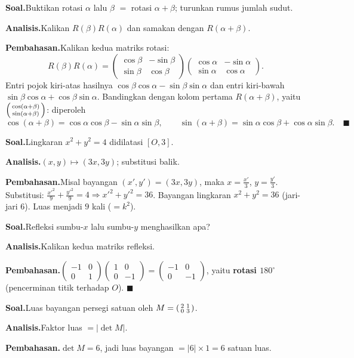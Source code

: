 \documentclass[11pt,a4paper]{report}
\theoremstyle{gaya}
\newcommand{\knomor}[1]{\par\medskip\noindent{\bfseries\color{ungu}#1}\par\nopagebreak}
\newcommand{\ksoal}{\noindent\textbf{\color{biru}Soal.}\space}
\newcommand{\kanalisis}{\par\noindent\textbf{\color{oranye}Analisis.}\space}
\newcommand{\kbahas}{\par\noindent\textbf{\color{hijau}Pembahasan.}\space}
\begin{document}
\knomor{C.2}
\ksoal Buktikan rotasi $\alpha$ lalu $\beta$ $=$ rotasi $\alpha+\beta$; turunkan rumus jumlah sudut.
\kanalisis Kalikan $R(\beta)R(\alpha)$ dan samakan dengan $R(\alpha+\beta)$.
\kbahas Kalikan kedua matriks rotasi:
\[
R(\beta)R(\alpha)=\begin{pmatrix}\cos\beta&-\sin\beta\\ \sin\beta&\cos\beta\end{pmatrix}\begin{pmatrix}\cos\alpha&-\sin\alpha\\ \sin\alpha&\cos\alpha\end{pmatrix}.
\]
Entri pojok kiri-atas hasilnya $\cos\beta\cos\alpha-\sin\beta\sin\alpha$ dan entri kiri-bawah $\sin\beta\cos\alpha+\cos\beta\sin\alpha$. Bandingkan dengan kolom pertama $R(\alpha+\beta)$, yaitu $\begin{psmallmatrix}\cos(\alpha+\beta)\\ \sin(\alpha+\beta)\end{psmallmatrix}$: diperoleh
\[
\cos(\alpha+\beta)=\cos\alpha\cos\beta-\sin\alpha\sin\beta,\qquad
\sin(\alpha+\beta)=\sin\alpha\cos\beta+\cos\alpha\sin\beta. \quad\blacksquare
\]

\knomor{C.3}
\ksoal Lingkaran $x^2+y^2=4$ didilatasi $[O,3]$.
\kanalisis $(x,y)\mapsto(3x,3y)$; substitusi balik.
\kbahas Misal bayangan $(x',y')=(3x,3y)$, maka $x=\tfrac{x'}3$, $y=\tfrac{y'}3$. Substitusi: $\tfrac{x'^2}{9}+\tfrac{y'^2}{9}=4\Rightarrow x'^2+y'^2=36$. Bayangan lingkaran $x^2+y^2=36$ (jari-jari $6$). Luas menjadi $9$ kali ($=k^2$).

\knomor{C.4}
\ksoal Refleksi sumbu-$x$ lalu sumbu-$y$ menghasilkan apa?
\kanalisis Kalikan kedua matriks refleksi.
\kbahas $\begin{pmatrix}-1&0\\0&1\end{pmatrix}\begin{pmatrix}1&0\\0&-1\end{pmatrix}=\begin{pmatrix}-1&0\\0&-1\end{pmatrix}$, yaitu \textbf{rotasi $180^\circ$} (pencerminan titik terhadap $O$). $\blacksquare$

\knomor{C.5}
\ksoal Luas bayangan persegi satuan oleh $M=\begin{psmallmatrix}2&1\\0&3\end{psmallmatrix}$.
\kanalisis Faktor luas $=|\det M|$.
\kbahas $\det M=6$, jadi luas bayangan $=|6|\times1=6$ satuan luas.
\end{document}
